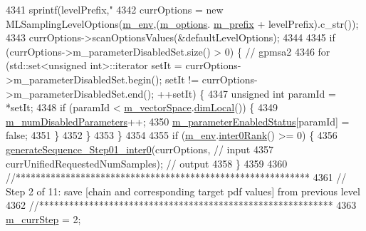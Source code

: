 \begin{DoxyCode}
{4341     sprintf(levelPrefix,\textcolor{stringliteral}{"%
4342     currOptions = \textcolor{keyword}{new} MLSamplingLevelOptions(\hyperlink{class_q_u_e_s_o_1_1_m_l_sampling_a13f1ca4fe9f94822fe572a743eaced1d}{m\_env},(\hyperlink{class_q_u_e_s_o_1_1_m_l_sampling_af8504cc57ec72b3c52833826b2bfff8e}{m\_options}.
      \hyperlink{class_q_u_e_s_o_1_1_m_l_sampling_options_a1d3d48598e0b59b46337ce66a52671a5}{m\_prefix} + levelPrefix).c\_str());
4343     currOptions->scanOptionsValues(&defaultLevelOptions);
4344 
4345     \textcolor{keywordflow}{if} (currOptions->m\_parameterDisabledSet.size() > 0) \{ \textcolor{comment}{// gpmsa2}
4346       \textcolor{keywordflow}{for} (std::set<unsigned int>::iterator setIt = currOptions->m\_parameterDisabledSet.begin(); setIt != 
      currOptions->m\_parameterDisabledSet.end(); ++setIt) \{
4347         \textcolor{keywordtype}{unsigned} \textcolor{keywordtype}{int} paramId = *setIt;
4348         \textcolor{keywordflow}{if} (paramId < \hyperlink{class_q_u_e_s_o_1_1_m_l_sampling_a7bc4c72f65ba9166ed94a6e198b0915b}{m\_vectorSpace}.\hyperlink{class_q_u_e_s_o_1_1_vector_space_a5829a1f4f996f8307c840b705144d666}{dimLocal}()) \{
4349           \hyperlink{class_q_u_e_s_o_1_1_m_l_sampling_afbe27e6149562020663b72da6592d933}{m\_numDisabledParameters}++;
4350           \hyperlink{class_q_u_e_s_o_1_1_m_l_sampling_ac76690384f70d74b8662faf7a051449e}{m\_parameterEnabledStatus}[paramId] = \textcolor{keyword}{false};
4351         \}
4352       \}
4353     \}
4354 
4355     \textcolor{keywordflow}{if} (\hyperlink{class_q_u_e_s_o_1_1_m_l_sampling_a13f1ca4fe9f94822fe572a743eaced1d}{m\_env}.\hyperlink{class_q_u_e_s_o_1_1_base_environment_ae106b5bb8a80b655b88b3a26b1e7c185}{inter0Rank}() >= 0) \{
4356       \hyperlink{class_q_u_e_s_o_1_1_m_l_sampling_aea8da13aed5b04e64b8490ca5f107889}{generateSequence\_Step01\_inter0}(currOptions,                     \textcolor{comment}{//
       input}
4357                                      currUnifiedRequestedNumSamples); \textcolor{comment}{// output}
4358     \}
4359 
4360     \textcolor{comment}{//***********************************************************}
4361     \textcolor{comment}{// Step 2 of 11: save [chain and corresponding target pdf values] from previous level}
4362     \textcolor{comment}{//***********************************************************}
4363     \hyperlink{class_q_u_e_s_o_1_1_m_l_sampling_a1b1f8ccb4823bdfa26ec652f0807c63e}{m\_currStep} = 2;
}}
\end{DoxyCode}
